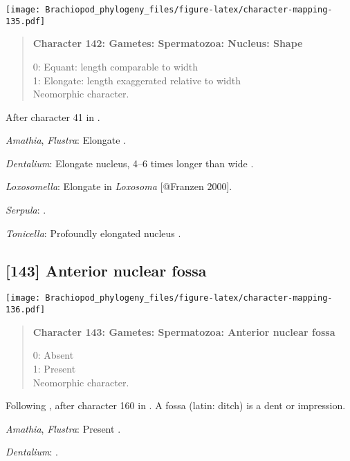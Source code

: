 \documentclass[openany]{book}
\theoremstyle{definition}
\theoremstyle{definition}
\theoremstyle{definition}
\theoremstyle{remark}
\begin{document}
\texttt{[image: Brachiopod\_phylogeny\_files/figure-latex/character-mapping-135.pdf]}

\begin{quote}
\textbf{Character 142: Gametes: Spermatozoa: Nucleus: Shape}

0: Equant: length comparable to width\\
1: Elongate: length exaggerated relative to width\\
Neomorphic character.
\end{quote}

After character 41 in \citet{Ponder1997}.

\hypertarget{Amathia-coding-142}{}
\emph{Amathia}, \emph{Flustra}: Elongate \citep{Franzen1981}.

\hypertarget{Dentalium-coding-142}{}
\emph{Dentalium}: Elongate nucleus, 4--6 times longer than wide
\citep{DufresneDube1983}.

\hypertarget{Loxosomella-coding-142}{}
\emph{Loxosomella}: Elongate in \emph{Loxosoma} {[}@Franzen 2000{]}.

\hypertarget{Serpula-coding-142}{}
\emph{Serpula}: \citet{Gherardi2011}.

\hypertarget{Tonicella-coding-142}{}
\emph{Tonicella}: Profoundly elongated nucleus
\citep{BucklandNicks1988}.

\subsection*{{[}143{]} Anterior nuclear
fossa}\label{anterior-nuclear-fossa}

\texttt{[image: Brachiopod\_phylogeny\_files/figure-latex/character-mapping-136.pdf]}

\begin{quote}
\textbf{Character 143: Gametes: Spermatozoa: Anterior nuclear fossa}

0: Absent\\
1: Present\\
Neomorphic character.
\end{quote}

Following \citet{Smith2012}, after character 160 in \citet{Giribet2002}.
A fossa (latin: ditch) is a dent or impression.

\hypertarget{Amathia-coding-143}{}
\emph{Amathia}, \emph{Flustra}: Present \citep[in
\emph{Tubulipora};][]{Franzen1984}.

\hypertarget{Dentalium-coding-143}{}
\emph{Dentalium}: \citet{DufresneDube1983}.
\end{document}
